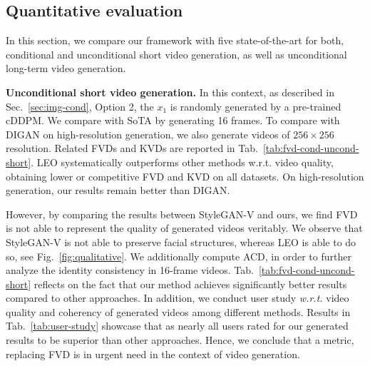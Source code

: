 \begin{table}[!t]
\begin{center}
\setlength\arrayrulewidth{0.8pt}
\end{center}
\caption{\textbf{Evaluation for unconditional long-term video generation.} LEO outperforms other methods on long-term (128 frames) video generation w.r.t. FVD, KVD and ACD.}
\label{tab:fvd-uncond-long}
\end{table}

\subsection{Quantitative evaluation}
In this section, we compare our framework with five state-of-the-art for both, conditional and unconditional short video generation, as well as unconditional long-term video generation.

\textbf{Unconditional short video generation.} In this context, as described in Sec.~\ref{sec:img-cond}, Option 2, the $x_1$ is randomly generated by a pre-trained cDDPM. We compare with SoTA by generating 16 frames. To compare with DIGAN on high-resolution generation, we also generate videos of $256\times 256$ resolution. Related FVDs and KVDs are reported in Tab.~\ref{tab:fvd-cond-uncond-short}. LEO systematically outperforms other methods w.r.t. video quality, obtaining lower or competitive FVD and KVD on all datasets. On high-resolution generation, our results remain better than DIGAN. 

However, by comparing the results between StyleGAN-V and ours, we find FVD is not able to represent the quality of generated videos veritably. We observe that StyleGAN-V is not able to preserve facial structures, whereas LEO is able to do so, see Fig.~\ref{fig:qualitative}. We additionally compute ACD, in order to further analyze the identity consistency in 16-frame videos. Tab.~\ref{tab:fvd-cond-uncond-short} reflects on the fact that our method achieves significantly better results compared to other approaches. In addition, we conduct user study \textit{w.r.t.} video quality and coherency of generated videos among different methods. Results in Tab.~{\ref{tab:user-study}} showcase that as nearly all users rated for our generated results to be superior than other approaches. Hence, we conclude that a metric, replacing FVD is in urgent need in the context of video generation.

